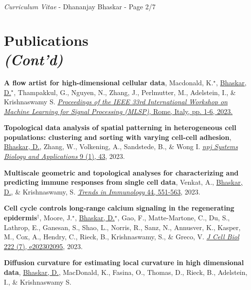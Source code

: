 \documentclass[margin,line]{res}
\begin{document}
\begin{resume}
\newpage
\begin{flushright}
\textit{Curriculum Vitae} - Dhananjay Bhaskar - Page 2/7
\end{flushright}
\vspace*{.15cm}

\section{\sc Publications\\\textit{(Cont'd)}}
{
\renewcommand\leftmargini{0em}
\begin{etaremune}[start=16]
\item{\bf A flow artist for high-dimensional cellular data},
Macdonald, K.$^\star$, \underline{Bhaskar, D.}$^\star$, Thampakkul, G., Nguyen, N., Zhang, J., Perlmutter, M., Adelstein, I., \& Krishnaswamy S.
\href{https://doi.org/10.1109/MLSP55844.2023.10285942}{\textit{Proceedings of the IEEE 33rd International Workshop on Machine Learning for Signal Processing (MLSP)}, Rome, Italy, pp. 1-6, 2023.}
\item{\bf Topological data analysis of spatial patterning in heterogeneous cell populations: clustering and sorting with varying cell-cell adhesion},
\underline{Bhaskar, D.}, Zhang, W., Volkening, A., Sandstede, B., \& Wong I.
\href{https://www.nature.com/articles/s41540-023-00302-8}{\textit{npj Systems Biology and Applications} 9 (1), 43}, 2023.
\vspace*{.1cm}
\item{\bf Multiscale geometric and topological analyses for characterizing and predicting immune responses from single cell data},
Venkat, A., \underline{Bhaskar, D.}, \& Krishnaswamy, S.
\href{https://doi.org/10.1016/j.it.2023.05.003}{\textit{Trends in Immunology} 44, 551-563}, 2023.
\vspace*{.1cm}
\item{\bf Cell cycle controls long-range calcium signaling in the regenerating epidermis$^\dagger$}, 
Moore, J.$^\star$, \underline{Bhaskar, D.}$^\star$, Gao, F., Matte-Martone, C., Du, S., Lathrop, E., Ganesan, S., Shao, L., Norris, R., Sanz, N., Annusver, K., Kasper, M., Cox, A., Hendry, C., Rieck, B., Krishnaswamy, S., \& Greco, V.
\href{https://doi.org/10.1083/jcb.202302095}{\textit{J Cell Biol} 222 (7), e202302095}, 2023.
\vspace*{.1cm}
\item{\bf Diffusion curvature for estimating local curvature in high dimensional data},
\underline{Bhaskar, D.}, MacDonald, K., Fasina, O., Thomas, D., Rieck, B., Adelstein, I., \& Krishnaswamy S.

\end{etaremune}}
\end{resume}
\end{document}
